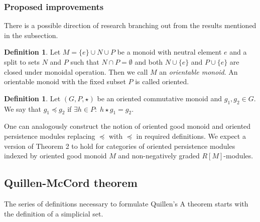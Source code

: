 \documentclass[english,12pt]{article}
\newcounter{stmcounter}[section]
\numberwithin{equation}{section}
\theoremstyle{definition}
\newtheorem{definition}[stmcounter]{Definition}
\theoremstyle{remark}
\newcommand{\define}[1]{{\textit{#1}}}
\begin{document}
\subsubsection{Proposed improvements}

There is a possible direction of research branching out from the results mentioned in the subsection.

\begin{definition}
  Let $M = \{e\} \cup N \cup P$ be a monoid with neutral element $e$ and a split to sets $N$ and $P$ such that $N \cap P = \emptyset$ and both $N \cup \{e\}$ and $P \cup \{e\}$ are closed under monoidal operation. Then we call $M$ an \define{orientable monoid}. An orientable monoid with the fixed subset $P$ is called oriented.
\end{definition}

\begin{definition}
  Let $(G,P,\star)$ be an oriented commutative monoid and $g_1, g_2 \in G$.
  We say that $g_1 \preccurlyeq g_2$ if $\exists h \in P:\; h \star g_1 = g_2$.
\end{definition}

One can analogously construct the notion of oriented good monoid and oriented persistence modules replacing $\preceq$ with $\preccurlyeq$ in required definitions. We expect a version of Theorem 2 to hold for categories of oriented persistence modules indexed by oriented good monoid $M$ and non-negatively graded $R[M]$-modules.

\subsection{Quillen-McCord theorem}

The series of definitions necessary to formulate Quillen's A theorem starts with the definition of a simplicial set.
\end{document}
